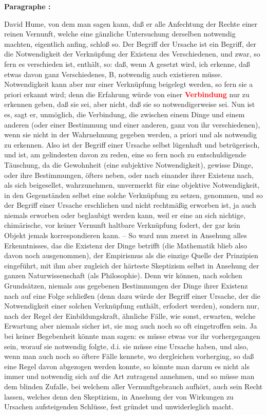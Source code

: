 \documentclass[a4paper,12pt,twoside]{book}
\newcommand{\match}[1]{\textcolor{red}{\textbf{#1}}}
\begin{document}
	\textbf{Paragraphe : }
	
	David Hume, von dem man sagen kann, daß er alle Anfechtung der Rechte einer reinen Vernunft, welche eine gänzliche Untersuchung derselben notwendig machten, eigentlich anfing, schloß so. Der Begriff der Ursache ist ein Begriff, der die Notwendigkeit der Verknüpfung der Existenz des Verschiedenen, und zwar, so fern es verschieden ist, enthält, so: daß, wenn A gesetzt wird, ich erkenne, daß etwas davon ganz Verschiedenes, B, notwendig auch existieren müsse. Notwendigkeit kann aber nur einer Verknüpfung beigelegt werden, so fern sie a priori erkannt wird; denn die Erfahrung würde von einer \match{Verbindung} nur zu erkennen geben, daß sie sei, aber nicht, daß sie so notwendigerweise sei. Nun ist es, sagt er, unmöglich, die Verbindung, die zwischen einem Dinge und einem anderen (oder einer Bestimmung und einer anderen, ganz von ihr verschiedenen), wenn sie nicht in der Wahrnehmung gegeben werden, a priori und als notwendig zu erkennen. Also ist der Begriff einer Ursache selbst lügenhaft und betrügerisch, und ist, am gelindesten davon zu reden, eine so fern noch zu entschuldigende Täuschung, da die Gewohnheit (eine subjektive Notwendigkeit), gewisse Dinge, oder ihre Bestimmungen, öfters neben, oder nach einander ihrer Existenz nach, als sich beigesellet, wahrzunehmen, unvermerkt für eine objektive Notwendigkeit, in den Gegenständen selbst eine solche Verknüpfung zu setzen, genommen, und so der Begriff einer Ursache erschlichen und nicht rechtmäßig erworben ist, ja auch niemals erworben oder beglaubigt werden kann, weil er eine an sich nichtige, chimärische, vor keiner Vernunft haltbare Verknüpfung fodert, der gar kein Objekt jemals korrespondieren kann. – So ward nun zuerst in Ansehung alles Erkenntnisses, das die Existenz der Dinge betrifft (die Mathematik blieb also davon noch ausgenommen), der Empirismus als die einzige Quelle der Prinzipien eingeführt, mit ihm aber zugleich der härteste Skeptizism selbst in Ansehung der ganzen Naturwissenschaft (als Philosophie). Denn wir können, nach solchen Grundsätzen, niemals aus gegebenen Bestimmungen der Dinge ihrer Existenz nach auf eine Folge schließen (denn dazu würde der Begriff einer Ursache, der die Notwendigkeit einer solchen Verknüpfung enthält, erfodert werden), sondern nur, nach der Regel der Einbildungskraft, ähnliche Fälle, wie sonst, erwarten, welche Erwartung aber niemals sicher ist, sie mag auch noch so oft eingetroffen sein. Ja bei keiner Begebenheit könnte man sagen: es müsse etwas vor ihr vorhergegangen sein, worauf sie notwendig folgte, d.i. sie müsse eine Ursache haben, und also, wenn man auch noch so öftere Fälle kennete, wo dergleichen vorherging, so daß eine Regel davon abgezogen werden konnte, so könnte man darum es nicht als immer und notwendig sich auf die Art zutragend annehmen, und so müsse man dem blinden Zufalle, bei welchem aller Vernunftgebrauch aufhört, auch sein Recht lassen, welches denn den Skeptizism, in Ansehung der von Wirkungen zu Ursachen aufsteigenden Schlüsse, fest gründet und unwiderleglich macht. 
	
\end{document}

